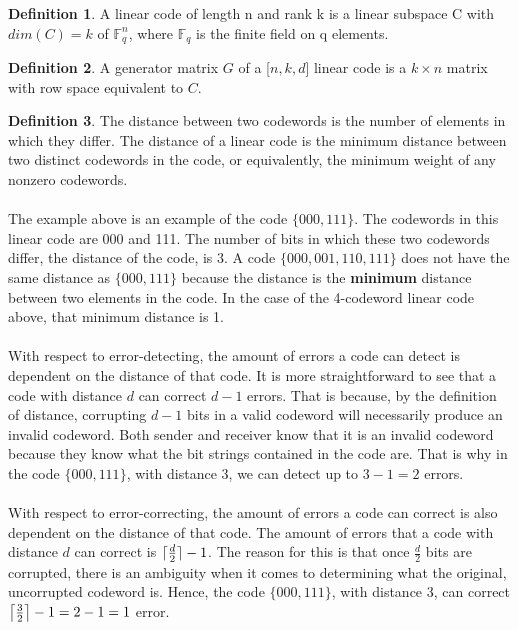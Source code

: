 \documentclass[15pt]{article}
\DeclarePairedDelimiter{\ceil}{\lceil}{\rceil}
\theoremstyle{definition}
\newtheorem{definition}{Definition}[section]
\begin{document}
\begin{definition}
A linear code of length n and rank k is a linear subspace C with $dim(C)=k$ of $\mathbb{F}_{q}^{n}$, where $\mathbb{F}_{q}$ is the finite field on q elements. 
\end{definition}	
\begin{definition}
A generator matrix $G$ of a [$n,k,d$] linear code is a $k \times n$ matrix with row space equivalent to $C$.
\end{definition}
\begin{definition}
The distance between two codewords is the number of elements in which they differ.  The distance of a linear code is the minimum distance between two distinct codewords in the code, or equivalently, the minimum weight of any nonzero codewords.
\end{definition}

\paragraph{}
The example above is an example of the code $\{000,111\}$.  The codewords in this linear code are 000 and 111.  The number of bits in which these two codewords differ, the distance of the code, is 3.  A code $\{000,001,110,111\}$ does not have the same distance as $\{000,111\}$ because the distance is the \textbf{minimum} distance between two elements in the code.  In the case of the 4-codeword linear code above, that minimum distance is 1.  

\paragraph{}
With respect to error-detecting, the amount of errors a code can detect is dependent on the distance of that code.  It is more straightforward to see that a code with distance $d$ can correct $d-1$ errors.  That is because, by the definition of distance, corrupting $d-1$ bits in a valid codeword will necessarily produce an invalid codeword.  Both sender and receiver know that it is an invalid codeword because they know what the bit strings contained in the code are.  That is why in the code $\{000,111\}$, with distance 3, we can detect up to $3-1 = 2$ errors.  

\paragraph{}
With respect to error-correcting, the amount of errors a code can correct is also dependent on the distance of that code.  The amount of errors that a code with distance $d$ can correct is $\ceil[\bigcap]{\frac{d}{2}} - 1$.  The reason for this is that once $\frac{d}{2}$ bits are corrupted, there is an ambiguity when it comes to determining what the original, uncorrupted codeword is.  Hence, the code $\{000,111\}$, with distance 3, can correct $\ceil[\big]{\frac{3}{2}}-1 = 2-1 = 1$ error.
\end{document}
